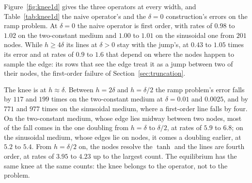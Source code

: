 \documentclass[11pt]{amsart}
\theoremstyle{definition}
\theoremstyle{remark}
\begin{document}
\begin{table}
  \centering
  \caption{The naive operator and the $\delta = 0$ construction on the ramp
  problem at $t = 2$: $\|e\|_2 / \|u\|_2$ at the nodes, against the
  Chebyshev reference at each $\delta$. \emph{floor}: the two references'
  difference $\|u_0 - u_\delta\|_2 / \|u_\delta\|_2$ at the largest count.
  Last line: the constant $c$ of the resistance deficit
  \eqref{eq:deficit}, measured from the two quadratures at every $\delta$
  and in closed form.}
  \label{tab:knee1d}
  \footnotesize
  
\end{table}

Figure~\ref{fig:knee1d} gives the three operators at every width, and
Table~\ref{tab:knee1d} the naive operator's and the $\delta = 0$ construction's errors on
the ramp problem. At $\delta = 0$ the naive operator is first order, with
rates of $0.98$ to $1.02$ on the two-constant medium and $1.00$ to $1.01$
on the sinusoidal one from $201$ nodes. While $h \ge 4\delta$ its lines at
$\delta > 0$ stay with the jump's, at $0.43$ to $1.05$ times its error and
at rates of $0.9$ to $1.6$ that depend on where the nodes happen to sample
the edge: its rows that see the edge treat it as a jump between two of
their nodes, the first-order failure of Section~\ref{sec:truncation}.

The knee is at $h \approx \delta$. Between $h = 2\delta$ and $h = \delta/2$
the ramp problem's error falls by $117$ and $199$ times on the
two-constant medium at $\delta = 0.01$ and $0.0025$, and by $771$ and $977$
times on the sinusoidal medium, where a first-order line falls by four. On
the two-constant medium, whose edge lies midway between two nodes, most of
the fall comes in the one doubling from $h = \delta$ to $\delta / 2$, at
rates of $5.9$ to $6.8$; on the sinusoidal medium, whose edges lie on
nodes, it comes a doubling earlier, at $5.2$ to $5.4$. From $h = \delta/2$
on, the nodes resolve the $\tanh$ and the lines are fourth order, at rates
of $3.95$ to $4.23$ up to the largest count. The equilibrium has the
same knee at the same counts: the knee belongs to the operator, not to the
problem.
\end{document}
